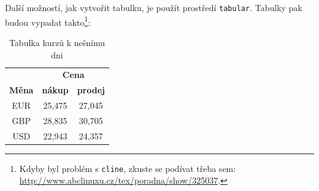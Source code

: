 \documentclass[a4paper, 11pt]{article}
\begin{document}
Další možností, jak vytvořit tabulku, je použít prostředí \texttt{tabular}. Tabulky pak budou vypadat takto\footnote{Kdyby byl problém s \texttt{cline}, zkuste se podívat třeba sem: \href{http://www.abclinuxu.cz/tex/poradna/show/325037}{http://www.abclinuxu.cz/tex/poradna/show/325037}.}:

\shorthandoff{-}
\begin{table}[ht]
    \begin{center}
        \begin{tabular}{|c|c|c|}
            \hline
                          & \multicolumn{2}{c|}{\textbf{Cena}}                   \\ \cline{2-3}
            \textbf{Měna} & \textbf{nákup}                     & \textbf{prodej} \\ \hline
            EUR           & 25,475                             & 27,045          \\
            GBP           & 28,835                             & 30,705          \\
            USD           & 22,943                             & 24,357          \\ \hline
        \end{tabular}
        \label{TabulkaKurzu}
        \caption{Tabulka kurzů k nešnímu dni}\label{tab1}
    \end{center}
\end{table}
\end{document}

